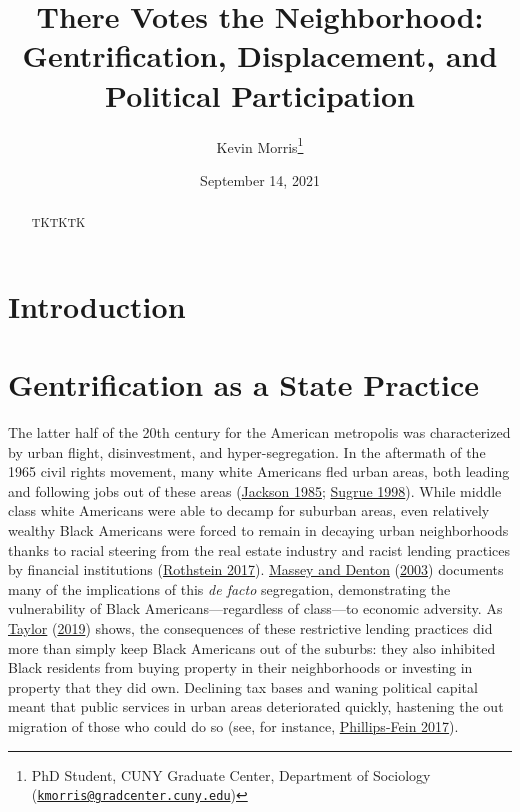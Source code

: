 \documentclass[
  12pt,
]{article}
\title{There Votes the Neighborhood: Gentrification, Displacement, and Political Participation}
\author{Kevin Morris\footnote{PhD Student, CUNY Graduate Center, Department of Sociology (\href{mailto:kmorris@gradcenter.cuny.edu}{\nolinkurl{kmorris@gradcenter.cuny.edu}})}}
\date{September 14, 2021}
\begin{document}
\maketitle
\begin{abstract}
TKTKTK
\end{abstract}

\pagebreak

\doublespacing

\hypertarget{introduction}{%
\section*{Introduction}\label{introduction}}

\hypertarget{gentrification-as-a-state-practice}{%
\section*{Gentrification as a State Practice}\label{gentrification-as-a-state-practice}}

The latter half of the 20th century for the American metropolis was characterized by urban flight, disinvestment, and hyper-segregation. In the aftermath of the 1965 civil rights movement, many white Americans fled urban areas, both leading and following jobs out of these areas (\protect\hyperlink{ref-Jackson1985}{Jackson 1985}; \protect\hyperlink{ref-Sugrue1998}{Sugrue 1998}). While middle class white Americans were able to decamp for suburban areas, even relatively wealthy Black Americans were forced to remain in decaying urban neighborhoods thanks to racial steering from the real estate industry and racist lending practices by financial institutions (\protect\hyperlink{ref-Rothstein2017}{Rothstein 2017}). \protect\hyperlink{ref-Massey2003}{Massey and Denton} (\protect\hyperlink{ref-Massey2003}{2003}) documents many of the implications of this \emph{de facto} segregation, demonstrating the vulnerability of Black Americans---regardless of class---to economic adversity. As \protect\hyperlink{ref-Taylor2019}{Taylor} (\protect\hyperlink{ref-Taylor2019}{2019}) shows, the consequences of these restrictive lending practices did more than simply keep Black Americans out of the suburbs: they also inhibited Black residents from buying property in their neighborhoods or investing in property that they did own. Declining tax bases and waning political capital meant that public services in urban areas deteriorated quickly, hastening the out migration of those who could do so (see, for instance, \protect\hyperlink{ref-Phillips-Fein2017}{Phillips-Fein 2017}).
\end{document}
